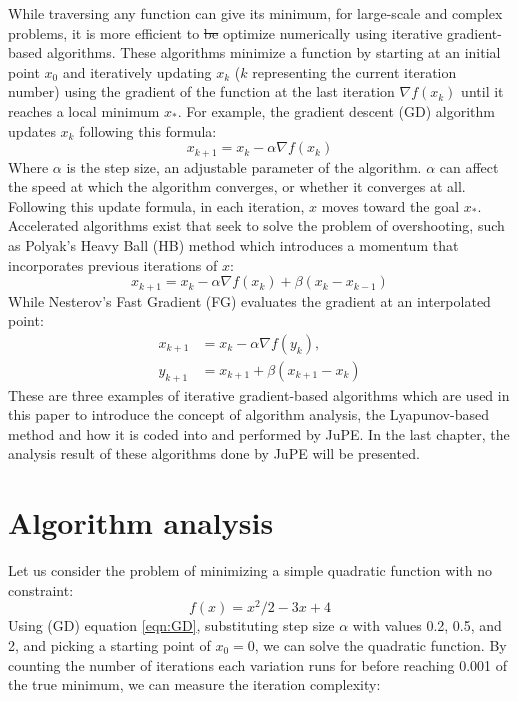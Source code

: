 While traversing any function can give its minimum, for large-scale and complex problems, it is more efficient to \sout{be} optimize numerically using iterative gradient-based  algorithms. These algorithms minimize a function by starting at an initial point \(x_{0}\) and iteratively updating  \(x_k\) (\(k\) representing the current iteration number)  using the gradient of the function at the last iteration $\nabla f(x_k)$ until it reaches a local minimum \(x_*\). For example, the gradient descent (GD) algorithm updates \(x_k\) following this formula:
\begin{equation}\label{eqn:GD}
  x_{k+1}=x_{k}-\alpha \nabla f(x_k)
\end{equation}
 Where $\alpha$ is the step size, an adjustable parameter of the algorithm.  $\alpha$ can affect the speed at which the algorithm converges, or whether it converges at all. Following this update formula, in each iteration, \(x\) moves toward the goal \(x_*\). Accelerated algorithms exist that seek to solve the problem of overshooting, such as Polyak’s Heavy Ball (HB) method which introduces a momentum that incorporates previous iterations of \(x\):
\begin{equation}\label{eqn:HB}
  x_{k+1}=x_k-\alpha \nabla f(x_k)+ \beta (x_k-x_{k-1})
\end{equation}
 While Nesterov’s Fast Gradient (FG)  evaluates the gradient at an interpolated point:
\begin{subequations} \label{eqn:FG}
  \begin{align}
    x_{k+1}     &=x_k-\alpha \nabla f(y_k), \label{eq_state}       \\
    y_{k+1} &=x_{k+1}+\beta (x_{k+1}-x_k) \label{eq_interpolated point}
  \end{align}
  \end{subequations}
These are three examples of iterative gradient-based algorithms which are used in this paper to introduce the concept of algorithm analysis, the Lyapunov-based method and how it is coded into and performed by JuPE. In the last chapter, the analysis result of these algorithms done by JuPE will be presented.
\section{Algorithm analysis}
Let us consider the problem of minimizing a simple quadratic function with no constraint:
\begin{equation} \label{eqn:quadratic}
    f(x) = x^2/2 - 3x + 4
\end{equation}
Using (GD) equation \ref{eqn:GD}, substituting step size $\alpha$ with values 0.2, 0.5, and 2, and picking a starting point of $x_0 = 0$, we can solve the quadratic function. By counting the number of iterations each variation runs for before reaching 0.001 of the true minimum, we can measure the iteration complexity: 

